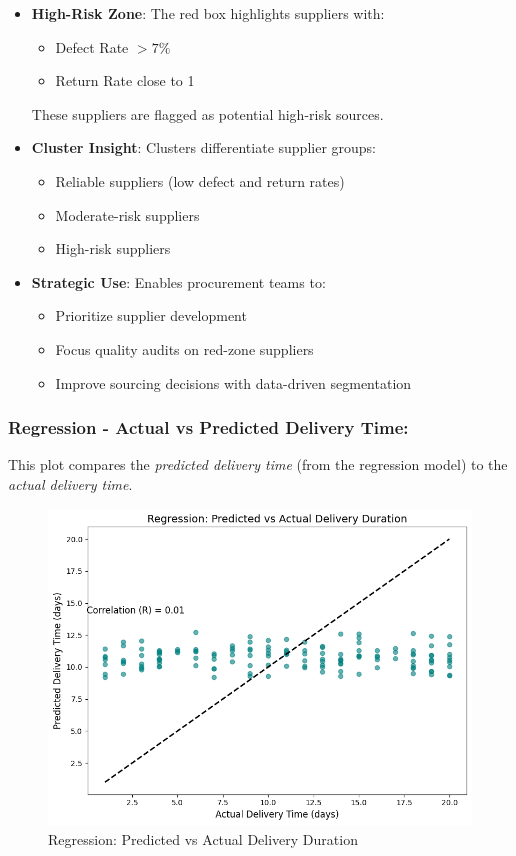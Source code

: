 \documentclass[10pt, twocolumn]{article}
\begin{document}
 \begin{itemize}        
    \item \textbf{High-Risk Zone}: The red box highlights suppliers with:
    \begin{itemize}
        \item Defect Rate $> 7\%$
        \item Return Rate close to 1
    \end{itemize}
    These suppliers are flagged as potential high-risk sources.
    
    \item \textbf{Cluster Insight}: Clusters differentiate supplier groups:
    \begin{itemize}
        \item Reliable suppliers (low defect and return rates)
        \item Moderate-risk suppliers
        \item High-risk suppliers
    \end{itemize}
    
    \item \textbf{Strategic Use}: Enables procurement teams to:
    \begin{itemize}
        \item Prioritize supplier development
        \item Focus quality audits on red-zone suppliers
        \item Improve sourcing decisions with data-driven segmentation
    \end{itemize}
\end{itemize}

\subsubsection{Regression - Actual vs Predicted Delivery Time:} 
This plot compares the \textit{predicted delivery time} (from the regression model) to the \textit{actual delivery time}.

\begin{figure}[H]
    \centering
    \includegraphics[width=1\linewidth]{Images/predicted_vs_actual_delivery.png}
    \caption{Regression: Predicted vs Actual Delivery Duration}
    \label{fig:predicted_vs_actual_delivery}
\end{figure}
\end{document}
